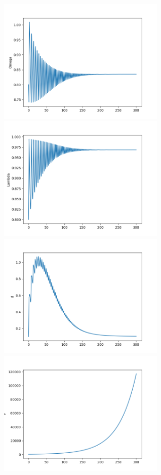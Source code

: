\documentclass[12pt,fleqn]{article}\usepackage{../../common}
\begin{document}
\includegraphics[height=6cm]{chaos_app03_01.png}
\includegraphics[height=6cm]{chaos_app03_02.png}
\includegraphics[height=6cm]{chaos_app03_03.png}
\includegraphics[height=6cm]{chaos_app03_04.png}
\end{document}
